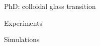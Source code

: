 \begin{frame}{PhD: colloidal glass transition}
\smallskip
{}
\begin{scriptsize}
Experiments 

Simulations 
\end{scriptsize}

\end{frame}


%
%
